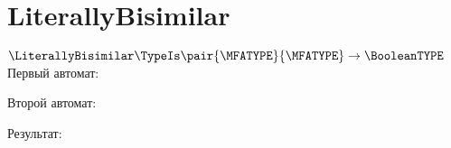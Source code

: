 \section{LiterallyBisimilar}
\begin{frame}{$\LiterallyBisimilar\TypeIs\pair{\MFATYPE}{\MFATYPE}\to\BooleanTYPE$}
	Первый автомат:

	Второй автомат:

	Результат:

\end{frame}